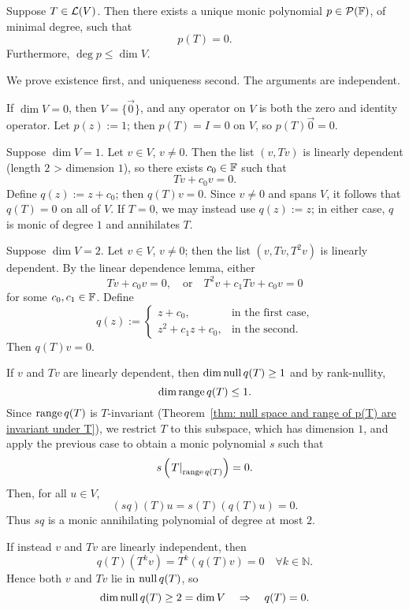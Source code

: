 \begin{thm}
  \label{thm: unique monic polynomial of smallest degree}
  Suppose $T \in \mathcal{L}(V)$. Then there exists a unique monic polynomial $p \in \mathcal{P}(\mathbb{F})$, of minimal degree, such that
  \[
  p(T) = 0.
  \]
  Furthermore, $\deg p \leq \dim V$.
\end{thm}

\begin{prf}
  We prove existence first, and uniqueness second. The arguments are independent.

   If $\dim V = 0$, then $V = \{ \vec{0} \}$, and any operator on $V$ is both the zero and identity operator. Let $p(z) := 1$; then $p(T) = I = 0$ on $V$, so $p(T)\vec{0} = 0$.

   Suppose $\dim V = 1$. Let $v \in V$, $v \ne 0$. Then the list $(v, Tv)$ is linearly dependent (length $2$ > dimension $1$), so there exists $c_0 \in \mathbb{F}$ such that
  \[
  Tv + c_0 v = 0.
  \]
  Define $q(z) := z + c_0$; then $q(T)v = 0$. Since $v \ne 0$ and spans $V$, it follows that $q(T) = 0$ on all of $V$. If $T = 0$, we may instead use $q(z) := z$; in either case, $q$ is monic of degree $1$ and annihilates $T$.

   Suppose $\dim V = 2$. Let $v \in V$, $v \ne 0$; then the list $(v, Tv, T^2v)$ is linearly dependent. By the linear dependence lemma, either
  \[
  Tv + c_0 v = 0, \quad \text{or} \quad T^2v + c_1 Tv + c_0 v = 0
  \]
  for some $c_0, c_1 \in \mathbb{F}$. Define
  \[
  q(z) :=
  \begin{cases}
    z + c_0, & \text{in the first case}, \\
    z^2 + c_1 z + c_0, & \text{in the second}.
  \end{cases}
  \]
  Then $q(T)v = 0$.

  If $v$ and $Tv$ are linearly dependent, then $\dim \operatorname{null} q(T) \geq 1$ and by rank-nullity,
  \[
  \dim \operatorname{range} q(T) \leq 1.
  \]
  Since $\operatorname{range} q(T)$ is $T$-invariant (Theorem~\ref{thm: null space and range of p(T) are invariant under T}), we restrict $T$ to this subspace, which has dimension $1$, and apply the previous case to obtain a monic polynomial $s$ such that
  \[
  s\left( \left. T \right|_{\operatorname{range} q(T)} \right) = 0.
  \]
  Then, for all $u \in V$,
  \[
  (sq)(T)u = s(T)(q(T)u) = 0.
  \]
  Thus $sq$ is a monic annihilating polynomial of degree at most $2$.

  If instead $v$ and $Tv$ are linearly independent, then
  \[
  q(T)(T^k v) = T^k(q(T)v) = 0 \quad \forall k \in \mathbb{N}.
  \]
  Hence both $v$ and $Tv$ lie in $\operatorname{null} q(T)$, so
  \[
  \dim \operatorname{null} q(T) \geq 2 = \dim V \quad \Rightarrow \quad q(T) = 0.
  \]


\end{prf}
